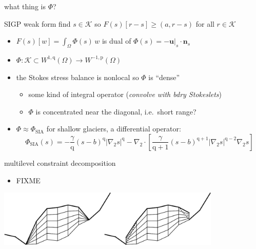 \documentclass[usepdftitle=false]{beamer}
\newcommand{\grad}{\nabla}
\newcommand{\bn}{\mathbf{n}}
\newcommand{\bu}{\mathbf{u}}
\newcommand{\ip}[2]{\left(#1,#2\right)}
\newcommand{\pp}{{\text{p}}}
\newcommand{\qq}{{\text{q}}}
\newcommand{\bus}{\bu|_s}
\begin{document}
\begin{frame}{what thing is $\Phi$?}

\begin{block}{SIGP weak form}
find $s \in \mathcal{K}$ so $F(s)[r - s] \ge \ip{a}{r-s}$ for all $r \in \mathcal{K}$
\end{block}

\begin{itemize}
\item $F(s)[w] = \int_\Omega \Phi(s)\, w$ is dual of $\Phi(s)=-\bus\cdot\bn_s$
\item $\Phi : \mathcal{K} \subset W^{1,\qq}(\Omega) \to W^{-1,\pp}(\Omega)$
\item the Stokes stress balance is nonlocal so $\Phi$ is ``dense''
    \begin{itemize}
    \item some kind of integral operator (\emph{convolve with bdry Stokeslets})
    \item $\Phi$ is concentrated near the diagonal, i.e.~short range?
    \end{itemize}
\item $\Phi \approx \Phi_{\text{SIA}}$ for shallow glaciers, a differential operator:
\small
    $$\Phi_{\text{SIA}}(s) = - \frac{\gamma}{\qq} (s-b)^{\qq} |\grad_2 s|^{\qq} - \grad_2 \cdot\left[\frac{\gamma}{\qq+1} (s-b)^{\qq+1} |\grad_2 s|^{\qq-2} \grad_2 s\right]$$
\normalsize
\end{itemize}
\end{frame}


\begin{frame}{multilevel constraint decomposition}

\begin{itemize}
\item FIXME \cite{BuelerMitchell2022}
\end{itemize}

\includegraphics[width=0.8\textwidth]{figs/extruded.png}


\end{frame}


\end{document}
